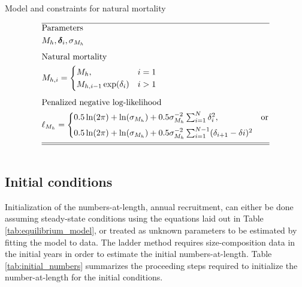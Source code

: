 \documentclass[12pt,letterpaper]{article}
\newcounter{saveEq}
\def\putEq{\setcounter{saveEq}{\value{equation}}}
\def\getEq{\setcounter{equation}{\value{saveEq}}}
\def\tableEq{ %
    \putEq \setcounter{equation}{0}
    \renewcommand{\theequation}{T\arabic{table}.\arabic{equation}}
    \vspace{-5mm}
    }
\def\normalEq{ %
    \getEq
    \renewcommand{\theequation}{\arabic{section}.\arabic{equation}}}
\begin{document}
    \begin{table}
      \centering
      \caption{Model and constraints for natural mortality}
      \label{tab:natural_mortality}
      \tableEq
      \begin{align}
      \hline \nonumber
      &\mbox{Parameters} \nonumber \\
      & M_h, \bm{\delta}_i, \sigma_{M_h} \label{T5.1} \\[1ex]
      &\mbox{Natural mortality} \nonumber \\
      & M_{h,i} =
      \begin{cases}
        M_h, &i=1\\
        M_{h,i-1} \exp(\delta_i) &i>1
      \end{cases} \label{T5.2} \\[1ex]
      &\mbox{Penalized negative log-likelihood} \nonumber \\
      &\ell_{M_h} = 
      \begin{cases}
      0.5 \ln(2 \pi) + \ln(\sigma_{M_h}) 
      + 0.5 \sigma_{M_h}^{-2} \sum_{i=1}^{N} \delta_{i}^2, & \mbox{or}  \\[1ex]
      0.5 \ln(2 \pi) + \ln(\sigma_{M_h}) 
      + 0.5 \sigma_{M_h}^{-2}\sum_{i=1}^{N-1}(\delta_{i+1} - \delta{i})^{2}  \\
      \end{cases}\label{T5.3}\\[1ex]
      \hline \hline \nonumber
      \end{align}
      \normalEq
    \end{table}


    \subsection*{Initial conditions} %
    \label{sub:initial_conditions}
      Initialization of the numbers-at-length, annual recruitment, can either be done assuming steady-state conditions using the equations laid out in Table \ref{tab:equilibrium_model}, or treated as unknown parameters to be estimated by fitting the model to data.  The ladder method requires size-composition data in the initial years in order to estimate the initial numbers-at-length.  Table \ref{tab:initial_numbers} summarizes the proceeding steps required to initialize the number-at-length for the initial conditions.
\end{document}
